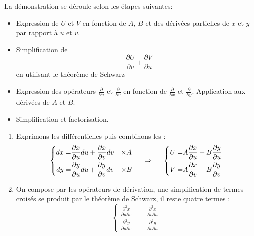 \begin{demo}
 La démonstration se déroule selon les étapes suivantes:
\begin{itemize}
 \item Expression de $U$ et $V$ en fonction de $A$, $B$ et des dérivées partielles de $x$ et $y$ par rapport à $u$ et $v$.
\item Simplification de 
\begin{displaymath}
-\frac{\partial U}{\partial v}+\frac{\partial V}{\partial u} 
\end{displaymath}
en utilisant le théorème de Schwarz
\item Expression des opérateurs $\frac{\partial}{\partial u}$ et $\frac{\partial}{\partial v}$ en fonction de $\frac{\partial}{\partial x}$ et $\frac{\partial}{\partial y}$. Application aux dérivées de $A$ et $B$.
\item Simplification et factorisation.
\end{itemize}
\begin{enumerate}
 \item Exprimons les différentielles puis combinons les :
\begin{displaymath}
 \left\lbrace
\begin{aligned}
dx =& \frac{\partial x}{\partial u}du+\frac{\partial x}{\partial v}dv &\times& A\\
dy =& \frac{\partial y}{\partial u}du+\frac{\partial y}{\partial v}dv &\times& B
\end{aligned}
 \right. 
\hspace{0.5cm}\Rightarrow \hspace{0.5cm}
\left\lbrace
\begin{aligned}
 U=& A\frac{\partial x}{\partial u}+B\frac{\partial y}{\partial u} \\
 V=& A\frac{\partial x}{\partial v}+B\frac{\partial y}{\partial v}
\end{aligned}
 \right. 
\end{displaymath}
\item On compose par les opérateurs de dérivation, une simplification de termes croisés se produit par le théorème de Schwarz, il reste quatre termes :
\begin{displaymath}
\left\lbrace
\begin{aligned}
 \frac{\partial ^2 x}{\partial u \partial v}=& \frac{\partial ^2 x}{\partial v \partial u}\\
 \frac{\partial ^2 y}{\partial u \partial v}=& \frac{\partial ^2 y}{\partial v \partial u}
\end{aligned}

\end{displaymath}
\end{enumerate}
\end{demo}
